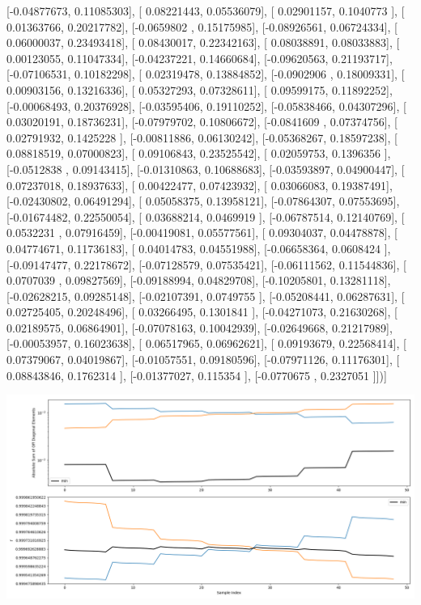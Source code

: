 \documentclass{article}
\begin{document}
       [-0.04877673,  0.11085303],
       [ 0.08221443,  0.05536079],
       [ 0.02901157,  0.1040773 ],
       [ 0.01363766,  0.20217782],
       [-0.0659802 ,  0.15175985],
       [-0.08926561,  0.06724334],
       [ 0.06000037,  0.23493418],
       [ 0.08430017,  0.22342163],
       [ 0.08038891,  0.08033883],
       [ 0.00123055,  0.11047334],
       [-0.04237221,  0.14660684],
       [-0.09620563,  0.21193717],
       [-0.07106531,  0.10182298],
       [ 0.02319478,  0.13884852],
       [-0.0902906 ,  0.18009331],
       [ 0.00903156,  0.13216336],
       [ 0.05327293,  0.07328611],
       [ 0.09599175,  0.11892252],
       [-0.00068493,  0.20376928],
       [-0.03595406,  0.19110252],
       [-0.05838466,  0.04307296],
       [ 0.03020191,  0.18736231],
       [-0.07979702,  0.10806672],
       [-0.0841609 ,  0.07374756],
       [ 0.02791932,  0.1425228 ],
       [-0.00811886,  0.06130242],
       [-0.05368267,  0.18597238],
       [ 0.08818519,  0.07000823],
       [ 0.09106843,  0.23525542],
       [ 0.02059753,  0.1396356 ],
       [-0.0512838 ,  0.09143415],
       [-0.01310863,  0.10688683],
       [-0.03593897,  0.04900447],
       [ 0.07237018,  0.18937633],
       [ 0.00422477,  0.07423932],
       [ 0.03066083,  0.19387491],
       [-0.02430802,  0.06491294],
       [ 0.05058375,  0.13958121],
       [-0.07864307,  0.07553695],
       [-0.01674482,  0.22550054],
       [ 0.03688214,  0.0469919 ],
       [-0.06787514,  0.12140769],
       [ 0.0532231 ,  0.07916459],
       [-0.00419081,  0.05577561],
       [ 0.09304037,  0.04478878],
       [ 0.04774671,  0.11736183],
       [ 0.04014783,  0.04551988],
       [-0.06658364,  0.0608424 ],
       [-0.09147477,  0.22178672],
       [-0.07128579,  0.07535421],
       [-0.06111562,  0.11544836],
       [ 0.0707039 ,  0.09827569],
       [-0.09188994,  0.04829708],
       [-0.10205801,  0.13281118],
       [-0.02628215,  0.09285148],
       [-0.02107391,  0.0749755 ],
       [-0.05208441,  0.06287631],
       [ 0.02725405,  0.20248496],
       [ 0.03266495,  0.1301841 ],
       [-0.04271073,  0.21630268],
       [ 0.02189575,  0.06864901],
       [-0.07078163,  0.10042939],
       [-0.02649668,  0.21217989],
       [-0.00053957,  0.16023638],
       [ 0.06517965,  0.06962621],
       [ 0.09193679,  0.22568414],
       [ 0.07379067,  0.04019867],
       [-0.01057551,  0.09180596],
       [-0.07971126,  0.11176301],
       [ 0.08843846,  0.1762314 ],
       [-0.01377027,  0.115354  ],
       [-0.0770675 ,  0.2327051 ]])]
\begin{center}
\includegraphics[scale=.9]{report_pickled_controls140/control_dpn_all.png}

\end{center}
\end{document}
